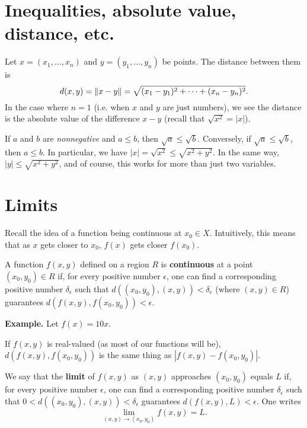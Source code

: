 \documentclass{article}
\begin{document}


\section*{Inequalities, absolute value, distance, etc.}
Let $x=(x_1,\ldots,x_n)$ and $y=(y_1,\ldots,y_n)$ be points. The distance
between them is 
\[ d(x,y)=\norm{x-y}= \sqrt{(x_1-y_1)^2+\cdots+(x_n-y_n)^2} .\]
In the case where $n=1$ (i.e. when $x$ and $y$ are just numbers), we see
the distance is the absolute value of the difference $x-y$ (recall that $\sqrt{x^2}=|x|$).

If $a$ and $b$ are \emph{nonnegative} and $a\leq b$, then 
$\sqrt{a} \leq \sqrt{b}$. Conversely, if $\sqrt{a} \leq \sqrt{b}$, then $a\leq b$. In particular,
we have $|x|=\sqrt{x^2} \leq \sqrt{x^2 + y^2}$. In the same way, $|y| \leq \sqrt{x^2+y^2}$, and of course,
this works for more than just two variables.

\section*{Limits}

Recall the idea of a function being continuous at $x_0 \in X$. Intuitively, this means that
as $x$ gets closer to $x_0$, $f(x)$ gets closer $f(x_0)$.
\begin{definition}
    A function $f(x,y)$ defined on a region $R$ is \textbf{continuous} at a point $(x_0,y_0) \in R$ if, 
    for every positive number $\epsilon$,  one can find a corresponding positive number $\delta_\epsilon$ such that
    $d((x_0,y_0),(x,y)) < \delta_\epsilon$ (where $(x,y) \in R$) guarantees $d(f(x,y),f(x_0,y_0)) < \epsilon$. 
\end{definition}

\textbf{Example.} Let $f(x) = 10x$.

If $f(x,y)$ is real-valued (as most of our functions will be), $d(f(x,y),f(x_0,y_0))$ is the same thing as $|f(x,y) - f(x_0,y_0)|$.

\begin{definition}
    We say that the \textbf{limit} of $f(x,y)$ as $(x,y)$ approaches $(x_0,y_0)$ equals $L$ if, 
    for every positive number $\epsilon$, one can find a corresponding positive number $\delta_\epsilon$ such that
    $0 < d((x_0,y_0),(x,y)) < \delta_\epsilon$ guarantees $d(f(x,y),L) < \epsilon$. One writes
    \[\lim_{(x,y)\to (x_0,y_0)} f(x,y) = L.\]
\end{definition}
\end{document}
